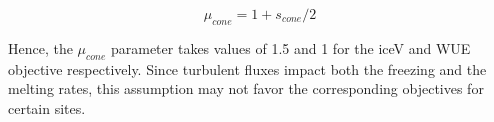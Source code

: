 \documentclass[tc, manuscript]{copernicus}
\begin{document}
\begin{equation}
  \mu_{cone} =1 + s_{cone}/2
\end{equation}

Hence, the $\mu_{cone}$ parameter takes values of 1.5 and 1 for the iceV and WUE objective respectively.  Since
turbulent fluxes impact both the freezing and the melting rates, this assumption may not favor the corresponding
objectives for certain sites.


\noappendix 



\end{document}
